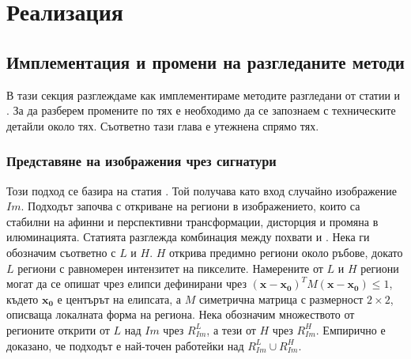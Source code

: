 \documentclass[a4paper,12pt]{article}
\begin{document}
\section{Реализация}

\subsection{Имплементация и промени на разгледаните методи} \label{implementation}

В тази секция разглеждаме как имплементираме методите разгледани от статии \cite{spinimages} и \cite{sift}. За да разберем промените по тях е необходимо да се запознаем с техническите детайли около тях. Съответно тази глава е утежнена спрямо тях.

\subsubsection{Представяне на изображения чрез сигнатури}

Този подход се базира на статия \cite{spinimages}. Той получава като вход случайно изображение $Im$. Подходът започва с откриване на региони в изображението, които са стабилни на афинни и перспективни трансформации, дисторция и промяна в илюминацията. Статията разглежда комбинация между похвати \cite{shapeadaptedsmoothingfor3dcues} и \cite{affineinvariantipdetector}. Нека ги обозначим съответно с $L$ и $H$. $H$ открива предимно региони около ръбове, докато $L$ региони с равномерен интензитет на пикселите. Намерените от $L$ и $H$ региони могат да се опишат чрез елипси дефинирани чрез $(\mathbf{x}-\mathbf{x_0})^T M (\mathbf{x}-\mathbf{x_0}) \leq 1$, където $\mathbf{x_0}$ е центърът на елипсата, а $M$ симетрична матрица с размерност $2\times2$, описваща локалната форма на региона. Нека обозначим множеството от регионите открити от $L$ над $Im$ чрез $R_{Im}^L$, а тези от $H$ чрез $R_{Im}^H$. Емпирично е доказано, че подходът е най-точен работейки над $R_{Im}^L \cup R_{Im}^H$.

\bigbreak
\end{document}
